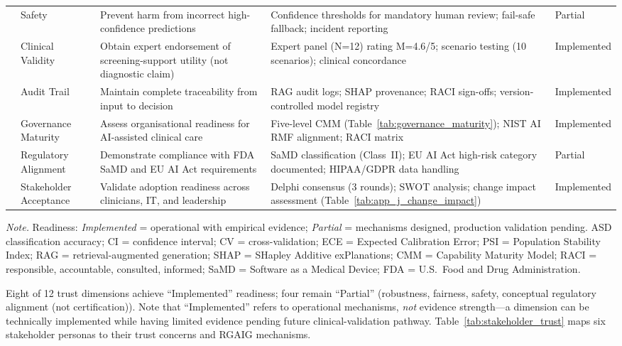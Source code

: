 \begin{table}[!htbp]
\begin{tabularx}{\textwidth}{@{} p{0.4cm} >{\raggedright\arraybackslash}p{1.6cm} L L >{\raggedright\arraybackslash}p{1.6cm} @{}}
 & Safety & Prevent harm from incorrect high-confidence predictions & Confidence thresholds for mandatory human review; fail-safe fallback; incident reporting & Partial \\
 & Clinical Validity & Obtain expert endorsement of screening-support utility (not diagnostic claim) & Expert panel (N=12) rating M=4.6/5; scenario testing (10 scenarios); clinical concordance & Implemented \\
 & Audit Trail & Maintain complete traceability from input to decision & RAG audit logs; SHAP provenance; RACI sign-offs; version-controlled model registry & Implemented \\
 & Governance Maturity & Assess organisational readiness for AI-assisted clinical care & Five-level CMM (Table~\ref{tab:governance_maturity}); NIST AI RMF alignment; RACI matrix & Implemented \\
 & Regulatory Alignment & Demonstrate compliance with FDA SaMD and EU AI Act requirements & SaMD classification (Class~II); EU AI Act high-risk category documented; HIPAA/GDPR data handling & Partial \\
 & Stakeholder Acceptance & Validate adoption readiness across clinicians, IT, and leadership & Delphi consensus (3 rounds); SWOT analysis; change impact assessment (Table~\ref{tab:app_j_change_impact}) & Implemented \\
\bottomrule
\end{tabularx}
\vspace{0.5em}\noindent\textit{Note.} Readiness: \textit{Implemented} = operational with empirical evidence; \textit{Partial} = mechanisms designed, production validation pending. ASD classification accuracy; CI = confidence interval; CV = cross-validation; ECE = Expected Calibration Error; PSI = Population Stability Index; RAG = retrieval-augmented generation; SHAP = SHapley Additive exPlanations; CMM = Capability Maturity Model; RACI = responsible, accountable, consulted, informed; SaMD = Software as a Medical Device; FDA = U.S.\ Food and Drug Administration.
\end{table}

\noindent Eight of 12 trust dimensions achieve ``Implemented'' readiness; four remain ``Partial'' (robustness, fairness, safety, conceptual regulatory alignment (not certification)). Note that ``Implemented'' refers to operational mechanisms, \textit{not} evidence strength---a dimension can be technically implemented while having limited evidence pending future clinical-validation pathway. Table~\ref{tab:stakeholder_trust} maps six stakeholder personas to their trust concerns and RGAIG mechanisms.

